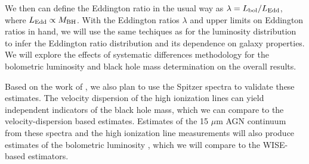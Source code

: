 \documentclass[12pt, preprint]{hacked-aastex}
\begin{document}
We then can define the Eddington ratio in the usual way as $\lambda =
L_{\rm bol} / L_{\rm Edd}$, where $L_{\rm Edd}\propto M_{\rm BH}$.
With the Eddington ratios $\lambda$ and upper limits on Eddington
ratios in hand, we will use the same techiques as for the luminosity
distribution to infer the Eddington ratio distribution and its
dependence on galaxy properties. We will explore the effects of
systematic differences methodology for the bolometric luminosity and
black hole mass determination on the overall results.

Based on the work of \cite{dasyra08a}, we also plan to use the Spitzer
spectra to validate these estimates.  The velocity dispersion of the
high ionization lines can yield independent indicators of the black
hole mass, which we can compare to the velocity-dispersion based
estimates. Estimates of the 15 $\mu$m AGN continuum from these spectra
and the high ionization line measurements will also produce estimates
of the bolometric luminosity \cite{dasyra08a, shen20a}, which we will
compare to the WISE-based estimators.

%
\end{document}
